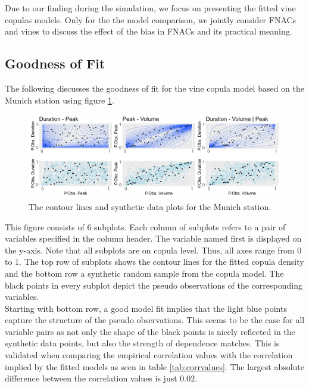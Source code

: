 \documentclass[
]{krantz}
\begin{document}
Due to our finding during the simulation, we focus on presenting the fitted vine copulas models.
Only for the the model comparison, we jointly consider FNACs and vines to discuss the
effect of the bias in FNACs and its practical meaning.

\subsection{Goodness of Fit}\label{goodness-of-fit}

The following discusses the goodness of fit for the vine copula model
based on the Munich station using figure \ref{fig:visualGoF}.

\begin{figure}

{\centering \includegraphics[width=0.7\linewidth]{work/04-floodfreq/figures/app_visualGOF} 

}

\caption{The contour lines and synthetic data plots for the Munich station.}\label{fig:visualGoF}
\end{figure}

This figure consists of \(6\) subplots.
Each column of subplots refers to a pair of variables specified in the column header.
The variable named first is displayed on the y-axis.
Note that all subplots are on copula level. Thus, all axes range from \(0\) to \(1\).
The top row of subplots shows the contour lines for the fitted copula density and the bottom row a synthetic
random sample from the copula model.
The black points in every subplot depict the pseudo observations of the corresponding variables.\\
Starting with bottom row, a good model fit implies that the light blue points capture the structure
of the pseudo observations.
This seems to be the case for all variable pairs as not only the shape of the black points is nicely
reflected in the synthetic data points, but also the strength of dependence matches.
This is validated when comparing the empirical correlation values with the correlation implied
by the fitted models as seen in table \ref{tab:corrvalues}.
The largest absolute difference between the correlation values is just \(0.02\).
\end{document}
